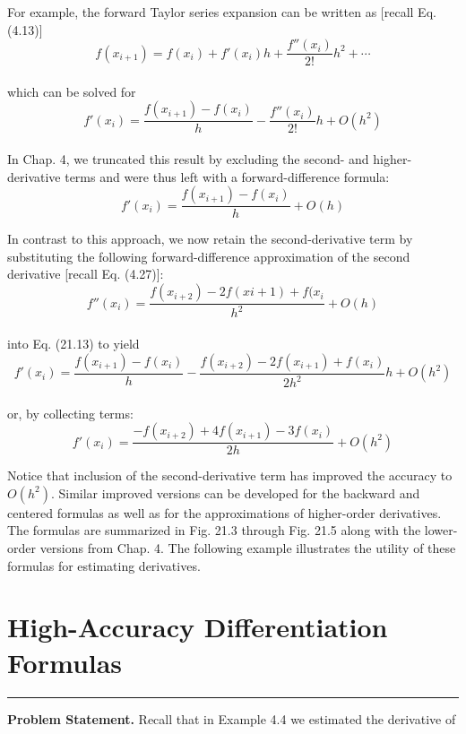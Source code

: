 \documentclass[../main.tex]{subfiles}
\begin{document}
For example, the forward Taylor series expansion can be written as [recall Eq. (4.13)]
\begin{equation}
	\tag{21.12}
	f(x_{i+1}) = f(x_{i}) + f'(x_{i})h + \dfrac{f''(x_{i})}{2!}h^{2} + \cdots
\end{equation}\\
which can be solved for
\begin{equation}
	\tag{21.13}
	f'(x_{i})= \dfrac{f(x_{i+1})-f(x_{i})}{h} - \dfrac{f''(x_{i})}{2!}h + O(h^{2})
\end{equation}\\
In Chap. 4, we truncated this result by excluding the second- and higher-derivative terms
and were thus left with a forward-difference formula:
\begin{equation}
	\tag{21.14}
	f'(x_{i}) = \dfrac{f(x_{i+1})-f(x_{i})}{h} + O(h)
\end{equation}

In contrast to this approach, we now retain the second-derivative term by substituting
the following forward-difference approximation of the second derivative [recall Eq. (4.27)]:
\begin{equation}
	\tag{21.15}
	f''(x_{i})=\dfrac{f(x_{i+2})-2f(x{i+1}) + f(x_{i}}{h^{2}} + O(h)
\end{equation}\\
into Eq. (21.13) to yield
\begin{equation}
	\tag{21.16}
	f'(x_{i})=\dfrac{f(x_{i+1})-f(x_{i})}{h}-\dfrac{ f(x_{i+2}) -2f(x_{i+1})  + f(x_{i})  }{ 2h^{2} } h + O(h^{2})
\end{equation}\\
or, by collecting terms:
\begin{equation}
	\tag{21.17}
	f'(x_{i}) = \dfrac{ -f(x_{i+2}) +4f(x_{i+1}) -3f(x_{i}) }{ 2h } + O(h^{2})
\end{equation}

Notice that inclusion of the second-derivative term has improved the accuracy to $O(h^{2})$.
Similar improved versions can be developed for the backward and centered formulas as
well as for the approximations of higher-order derivatives. The formulas are summarized in
Fig. 21.3 through Fig. 21.5 along with the lower-order versions from Chap. 4. The following example illustrates the utility of these formulas for estimating derivatives. 

\vspace{0,6in}
\section{High-Accuracy Differentiation Formulas}
\vspace{0,1in}
\hrule
\vspace{0,1in}
\textbf{Problem Statement.} Recall that in Example 4.4 we estimated the derivative of
\end{document}
